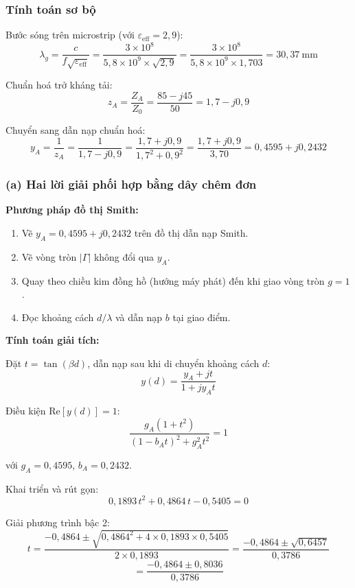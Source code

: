 \documentclass[12pt,a4paper]{article}
\begin{document}
\subsubsection{Tính toán sơ bộ}

Bước sóng trên microstrip (với $\varepsilon_{\text{eff}} = 2{,}9$):
\[
\lambda_g = \frac{c}{f\sqrt{\varepsilon_{\text{eff}}}} = \frac{3 \times 10^8}{5{,}8 \times 10^9 \times \sqrt{2{,}9}} = \frac{3 \times 10^8}{5{,}8 \times 10^9 \times 1{,}703} = 30{,}37~\text{mm}
\]

Chuẩn hoá trở kháng tải:
\[
z_A = \frac{Z_A}{Z_0} = \frac{85 - j45}{50} = 1{,}7 - j0{,}9
\]

Chuyển sang dẫn nạp chuẩn hoá:
\[
y_A = \frac{1}{z_A} = \frac{1}{1{,}7 - j0{,}9} = \frac{1{,}7 + j0{,}9}{1{,}7^2 + 0{,}9^2} = \frac{1{,}7 + j0{,}9}{3{,}70} = 0{,}4595 + j0{,}2432
\]

\subsubsection{(a) Hai lời giải phối hợp bằng dây chêm đơn}

\textbf{Phương pháp đồ thị Smith:}

\begin{enumerate}
    \item Vẽ $y_A = 0{,}4595 + j0{,}2432$ trên đồ thị dẫn nạp Smith.
    \item Vẽ vòng tròn $|\Gamma|$ không đổi qua $y_A$.
    \item Quay theo chiều kim đồng hồ (hướng máy phát) đến khi giao vòng tròn $g = 1$.
    \item Đọc khoảng cách $d/\lambda$ và dẫn nạp $b$ tại giao điểm.
\end{enumerate}

\textbf{Tính toán giải tích:}

Đặt $t = \tan(\beta d)$, dẫn nạp sau khi di chuyển khoảng cách $d$:
\[
y(d) = \frac{y_A + jt}{1 + jy_A t}
\]

Điều kiện $\text{Re}[y(d)] = 1$:
\[
\frac{g_A(1 + t^2)}{(1 - b_A t)^2 + g_A^2 t^2} = 1
\]

với $g_A = 0{,}4595$, $b_A = 0{,}2432$.

Khai triển và rút gọn:
\[
0{,}1893\,t^2 + 0{,}4864\,t - 0{,}5405 = 0
\]

Giải phương trình bậc 2:
\[
t = \frac{-0{,}4864 \pm \sqrt{0{,}4864^2 + 4 \times 0{,}1893 \times 0{,}5405}}{2 \times 0{,}1893} = \frac{-0{,}4864 \pm \sqrt{0{,}6457}}{0{,}3786}
\]
\[
= \frac{-0{,}4864 \pm 0{,}8036}{0{,}3786}
\]
\end{document}
